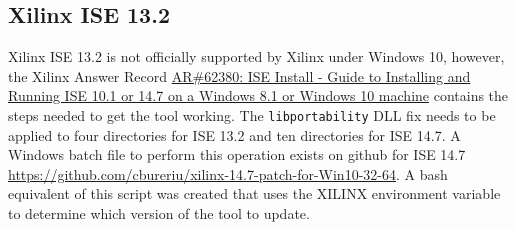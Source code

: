 \documentclass[10pt,twoside]{article}
\begin{document}
\subsection{Xilinx ISE 13.2}

Xilinx ISE 13.2 is not officially supported by Xilinx under Windows 10,
however, the Xilinx Answer Record
\href{https://www.xilinx.com/support/answers/62380.html}{AR\#62380: ISE
Install - Guide to Installing and Running ISE 10.1 or 14.7 on a Windows
8.1 or Windows 10 machine} contains the steps needed to get the tool
working. The \verb+libportability+ DLL fix needs to be applied to
four directories for ISE 13.2 and ten directories for ISE 14.7.
A Windows batch file to perform this operation exists on github
for ISE 14.7
%
\href{https://github.com/cbureriu/xilinx-14.7-patch-for-Win10-32-64}
{https://github.com/cbureriu/xilinx-14.7-patch-for-Win10-32-64}.
A bash equivalent of this script was created that uses the XILINX
environment variable to determine which version of the tool to update.
\end{document}
